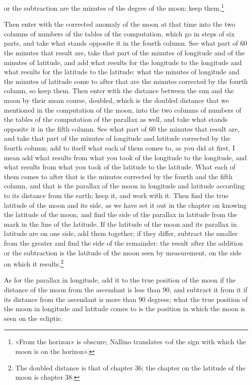 \documentclass[11pt]{article}
\newcommand{\ArPage}[1]{\marginpar{\footnotesize\color{gray}Ar.\,p.\,#1}}
\begin{document}
or the subtraction are the minutes of the degree of the moon; keep them.\footnote{«From the horizon» is obscure; Nallino translates «of the sign with which the moon is on the horizon».}\par
\par \ArPage{126}Then enter with the corrected anomaly of the moon at that time into the two columns of numbers of the tables of the computation, which go in steps of six parts, and take what stands opposite it in the fourth column. See what part of 60 the minutes that result are, take that part of the minutes of longitude and of the minutes of latitude, and add what results for the longitude to the longitude and what results for the latitude to the latitude: what the minutes of longitude and the minutes of latitude come to after that are the minutes corrected by the fourth column, so keep them. Then enter with the distance between the sun and the moon by their mean course, doubled, which is the doubled distance that we mentioned in the computation of the moon, into the two columns of numbers of the tables of the computation of the parallax as well, and take what stands opposite it in the fifth column. See what part of 60 the minutes that result are, and take that part of the minutes of longitude and latitude corrected by the fourth column; add to itself what each of them comes to, as you did at first, I mean add what results from what you took of the longitude to the longitude, and what results from what you took of the latitude to the latitude. What each of them comes to after that is the minutes corrected by the fourth and the fifth column, and that is the parallax of the moon in longitude and latitude according to its distance from the earth; keep it, and work with it. Then find the true latitude of the moon and its side, as we have set it out in the chapter on knowing the latitude of the moon, and find the side of the parallax in latitude from the mark in the line of the latitude. If the latitude of the moon and its parallax in latitude are on one side, add them together; if they differ, subtract the smaller from the greater and find the side of the remainder: the result after the addition or the subtraction is the latitude of the moon seen by measurement, on the side on which it results.\footnote{The doubled distance is that of chapter 36; the chapter on the latitude of the moon is chapter 38.}\par
\par As for the parallax in longitude, add it to the true position of the moon if the distance of the moon from the ascendant is less than 90, and subtract it from it if its distance from the ascendant is more than 90 degrees; what the true position of the moon in longitude and latitude comes to is the position in which the moon is seen on the ecliptic.\par
\end{document}
